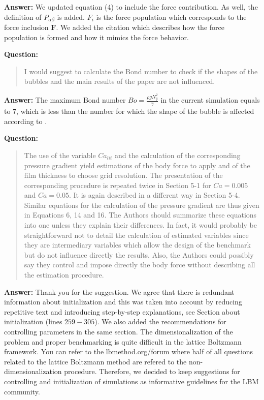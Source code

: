 \documentclass{article}
\begin{document}
\textbf{Answer:} We updated equation (4) to include the force contribution. As well, the definition
of $P_{\alpha\beta}$ is added. $F_i$ is the force population which corresponds to the force
inclusion $\bm{F}$. We added the citation which describes how the force population is formed and
how it
mimics the force behavior.

\textbf{Question:}
\begin{quotation}
I would suggest to calculate the Bond number to check if the shapes of the bubbles and the main
results of the paper are not inﬂuenced.
\end{quotation}

\textbf{Answer:} 
The maximum Bond number $Bo=\frac{\rho g N_y^2}{\gamma}$ in the
current simulation equals to $7$, which is less than the number for which the shape of the bubble is
affected according to \cite{zheng-large-ratio}.  

\textbf{Question:}
\begin{quotation}
The use of the variable $Ca_{lit}$ and the calculation of the corresponding pressure gradient yield
estimations of the body force to apply and of the film thickness to choose grid resolution. The
presentation
of the corresponding procedure is repeated twice in Section 5-1 for $Ca=0.005$ and $Ca=0.05$. It is
again described in a different way in Section 5-4. Similar equations for the calculation of the
pressure
gradient are thus given in Equations 6, 14 and 16. The Authors should summarize these equations
into one unless they explain their differences. In fact, it would probably be straightforward not to
detail the calculation of estimated variables since they are intermediary variables which allow the
design of the benchmark but do not inﬂuence directly the results. Also, the Authors could possibly
say they control and impose directly the body force without describing all the estimation procedure.
\end{quotation}

\textbf{Answer:} Thank you for the suggestion. We agree that there is redundant information
about initialization and this was taken into account by reducing repetitive text and
introducing step-by-step explanations, see Section about initialization (lines $259-305$). We also
added
the
recommendations for controlling parameters in the same section.  The
dimensionalization of the problem and proper benchmarking is quite difficult in the lattice
Boltzmann framework. You can refer to the lbmethod.org/forum where half of all questions related to
the lattice Boltzmann method are refered to the non-dimensionalization procedure. Therefore, we
decided to
keep suggestions for controlling and initialization of simulations as informative guidelines for the
LBM community.
\end{document}
